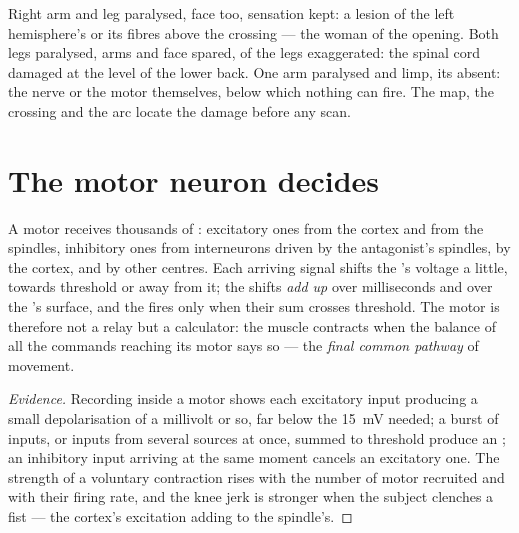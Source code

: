 \begin{example}\label{ex:g12:brain-and-movement:paralysis}
Right arm and leg paralysed, face too, sensation kept: a lesion of
the left hemisphere's  or its fibres above the crossing
--- the woman of the opening. Both legs paralysed, arms and face
spared,  of the legs exaggerated: the spinal cord damaged at
the level of the lower back. One arm paralysed and limp, its 
absent: the nerve or the motor  themselves, below which
nothing can fire. The map, the crossing and the arc locate the damage
before any scan.
\end{example}

\section{The motor neuron decides}

\begin{proposition}\label{prop:g12:brain-and-movement:integration}
A motor  receives thousands of : excitatory ones from
the cortex and from the spindles, inhibitory ones from interneurons
driven by the antagonist's spindles, by the cortex, and by other
centres. Each arriving signal shifts the 's voltage a little,
towards threshold or away from it; the shifts \emph{add up} over
milliseconds and over the 's surface, and the  fires only
when their sum crosses threshold. The motor  is therefore not a
relay but a calculator: the muscle contracts when the balance of all
the commands reaching its motor  says so --- the \emph{final
common pathway} of movement.
\end{proposition}
\begin{proof}[Evidence]
Recording inside a motor  shows each excitatory input producing
a small depolarisation of a millivolt or so, far below the
\qty{15}{mV} needed; a burst of inputs, or inputs from several
sources at once, summed to threshold produce an ; an
inhibitory input arriving at the same moment cancels an excitatory
one. The strength of a voluntary contraction rises with the number of
motor  recruited and with their firing rate, and the knee jerk
is stronger when the subject clenches a fist --- the cortex's
excitation adding to the spindle's.
\end{proof}

